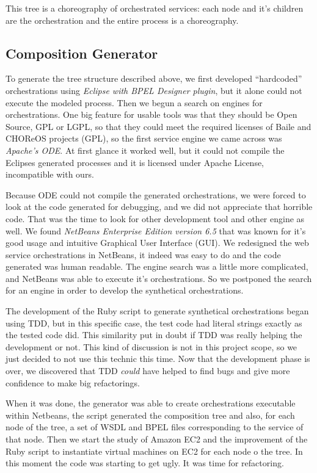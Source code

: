 This tree is a choreography of orchestrated services: each node and it's children are the orchestration and the entire process is a choreography.

\subsection{Composition Generator}
To generate the tree structure described above, we first developed ``hardcoded'' orchestrations using \emph{Eclipse with BPEL Designer plugin}, but it alone could not execute the modeled process. Then we begun a search on engines for orchestrations. One big feature for usable tools was that they should be Open Source, GPL or LGPL, so that they could meet the required licenses of Baile and CHOReOS projects (GPL), so the first service engine we came across was \emph{Apache's ODE}. At first glance it worked well, but it could not compile the Eclipses generated processes and it is licensed under Apache License, incompatible with ours.

Because ODE could not compile the generated orchestrations, we were forced to look at the code generated for debugging, and we did not appreciate that horrible code. That was the time to look for other development tool and other engine as well. We found \emph{NetBeans Enterprise Edition version 6.5} that was known for it's good usage and intuitive Graphical User Interface (GUI). We redesigned the web service orchestrations in NetBeans, it indeed was easy to do and the code generated was human readable. The engine search was a little more complicated, and NetBeans was able to execute it's orchestrations. So we postponed the search for an engine in order to develop the synthetical orchestrations.

The development of the Ruby script to generate synthetical orchestrations began using TDD, but in this specific case, the test code had literal strings exactly as the tested code did. This similarity put in doubt if TDD was really helping the development or not. This kind of discussion is not in this project scope, so we just decided to not use this technic this time. Now that the development phase is over, we discovered that TDD \emph{could} have helped to find bugs and give more confidence to make big refactorings.

When it was done, the generator was able to create orchestrations executable within Netbeans, the script generated the composition tree and also, for each node of the tree, a set of WSDL and BPEL files corresponding to the service of that node. Then we start the study of Amazon EC2 and the improvement of the Ruby script to instantiate virtual machines on EC2 for each node o the tree. In this moment the code was starting to get ugly. It was time for refactoring.

